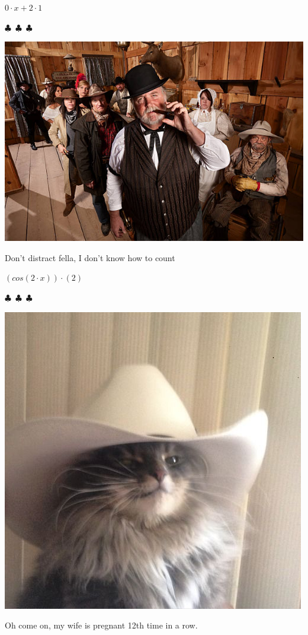 \documentclass{article}
\begin{document}
\begin{center}$
{{{0}\cdot{x}}+{{2}\cdot{1}}}
$\end{center}
\begin{center} $\clubsuit$~$\clubsuit$~$\clubsuit$ \end{center}\begin{center} \includegraphics[scale=1.4]{funny_pics/funny_bartender.jpg} \end{center} Don't distract fella, I don't know how to count
\begin{center}$
{{({cos{({{2}\cdot{x}})}})}\cdot{({2})}}
$\end{center}
\begin{center} $\clubsuit$~$\clubsuit$~$\clubsuit$ \end{center}\begin{center}  \includegraphics[scale=0.3]{funny_pics/cowboy_cat.jpg} \end{center}Oh come on, my wife is pregnant 12th time in a row.
\end{document}
